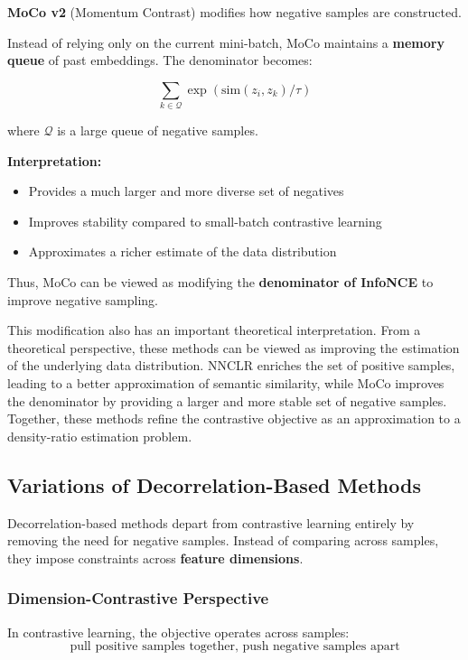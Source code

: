 \documentclass{article}
\begin{document}
\textbf{MoCo v2} (Momentum Contrast) modifies how negative samples are constructed.

Instead of relying only on the current mini-batch, MoCo maintains a \textbf{memory queue} of past embeddings. The denominator becomes:

\[
\sum_{k \in \mathcal{Q}} \exp(\text{sim}(z_i, z_k)/\tau)
\]

where $\mathcal{Q}$ is a large queue of negative samples.

\textbf{Interpretation:}
\begin{itemize}
\item Provides a much larger and more diverse set of negatives
\item Improves stability compared to small-batch contrastive learning
\item Approximates a richer estimate of the data distribution
\end{itemize}

Thus, MoCo can be viewed as modifying the \textbf{denominator of InfoNCE} to improve negative sampling.

This modification also has an important theoretical interpretation. From a theoretical perspective, these methods can be viewed as improving the estimation of the underlying data distribution. NNCLR enriches the set of positive samples, leading to a better approximation of semantic similarity, while MoCo improves the denominator by providing a larger and more stable set of negative samples. Together, these methods refine the contrastive objective as an approximation to a density-ratio estimation problem.

\subsection{Variations of Decorrelation-Based Methods}

Decorrelation-based methods depart from contrastive learning entirely by removing the need for negative samples. Instead of comparing across samples, they impose constraints across \textbf{feature dimensions}.

\subsubsection*{Dimension-Contrastive Perspective}

In contrastive learning, the objective operates across samples:
\[
\text{pull positive samples together, push negative samples apart}
\]
\end{document}
